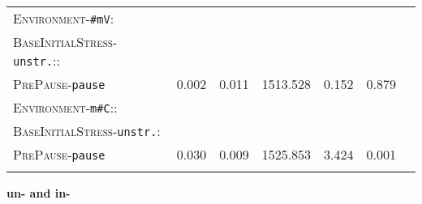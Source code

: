 \begin{table}
{\begin{tabular} {lrrrrrr}
		\textsc{Environment}-\texttt{\#mV}:&&&&&\\
		\textsc{BaseInitialStress}-\texttt{unstr.}::&&&&&\\
		\textsc{PrePause}-\texttt{pause} & \color{lsLightGray}0.002 & \color{lsLightGray}0.011 & \color{lsLightGray}1513.528 & \color{lsLightGray}0.152 &\color{lsLightGray}0.879 \\ 
		\textsc{Environment}-\texttt{m\#C}::&&&&&\\
		\textsc{BaseInitialStress}-\texttt{unstr.}:&&&&&\\
		\textsc{PrePause}-\texttt{pause }& 0.030 & 0.009 & 1525.853 & 3.424 & 0.001 \\ 
		\lspbottomrule 
			\end{tabular}
}


\end{table}
\clearpage

\textbf{un- and in-}


